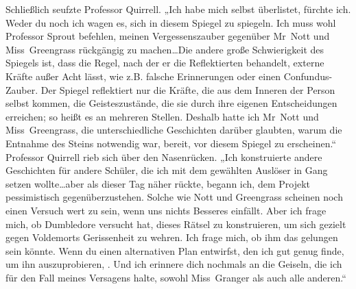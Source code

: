 Schließlich seufzte Professor Quirrell. „Ich habe mich selbst überlistet, fürchte ich. Weder du noch ich wagen es, sich in diesem Spiegel zu spiegeln. Ich muss wohl Professor Sprout befehlen, meinen Vergessenszauber gegenüber Mr~Nott und Miss~Greengrass rückgängig zu machen…Die andere große Schwierigkeit des Spiegels ist, dass die Regel, nach der er die Reflektierten behandelt, externe Kräfte außer Acht lässt, wie z.B. falsche Erinnerungen oder einen Confundus-Zauber. Der Spiegel reflektiert nur die Kräfte, die aus dem Inneren der Person selbst kommen, die Geisteszustände, die sie durch ihre eigenen Entscheidungen erreichen; so heißt es an mehreren Stellen. Deshalb hatte ich Mr~Nott und Miss~Greengrass, die unterschiedliche Geschichten darüber glaubten, warum die Entnahme des Steins notwendig war, bereit, vor diesem Spiegel zu erscheinen.“
Professor Quirrell rieb sich über den Nasenrücken.
„Ich konstruierte andere Geschichten für andere Schüler, die ich mit dem gewählten Auslöser in Gang setzen wollte…aber als dieser Tag näher rückte, begann ich, dem Projekt pessimistisch gegenüberzustehen. Solche wie Nott und Greengrass scheinen noch einen Versuch wert zu sein, wenn uns nichts Besseres einfällt. Aber ich frage mich, ob Dumbledore versucht hat, dieses Rätsel zu konstruieren, um sich gezielt gegen Voldemorts Gerissenheit zu wehren. Ich frage mich, ob ihm das gelungen sein könnte. Wenn du einen alternativen Plan entwirfst, den ich gut genug finde, um ihn auszuprobieren, . Und ich erinnere dich nochmals an die Geiseln, die ich für den Fall meines Versagens halte, sowohl Miss~Granger als auch alle anderen.“

